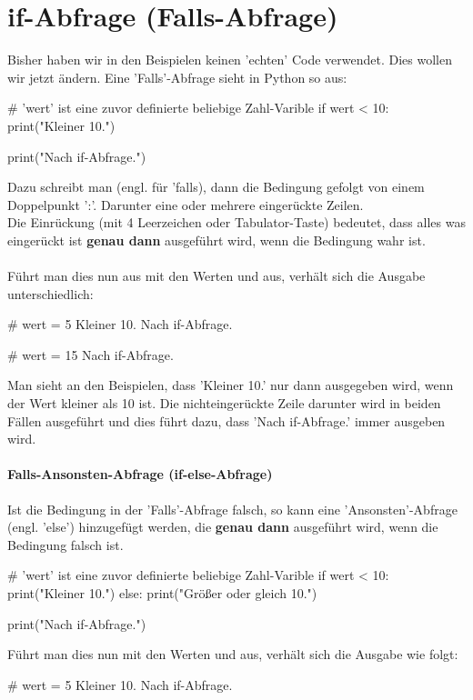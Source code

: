 \documentclass{\VorlagenPfad/coderdojokatext}
\begin{document}
\clearpage

\section{if-Abfrage (Falls-Abfrage)} Bisher haben wir in den Beispielen keinen 'echten' Code verwendet. Dies wollen wir jetzt ändern.
Eine 'Falls'-Abfrage sieht in Python so aus:

\begin{pythoncode}
# 'wert' ist eine zuvor definierte beliebige Zahl-Varible
if wert < 10:
	print("Kleiner 10.")
	
print("Nach if-Abfrage.")
\end{pythoncode}

Dazu schreibt man  (engl. für 'falls), dann die Bedingung gefolgt von einem Doppelpunkt ':'. Darunter eine oder mehrere eingerückte Zeilen.
\\
Die Einrückung (mit 4 Leerzeichen oder Tabulator-Taste) bedeutet, dass alles was eingerückt ist \textbf{genau dann} ausgeführt wird, wenn die Bedingung wahr ist.
\\
\\
Führt man dies nun aus mit den Werten  und  aus, verhält sich die Ausgabe unterschiedlich:
\begin{pythoncode}
# wert = 5
Kleiner 10.
Nach if-Abfrage.
\end{pythoncode}


\begin{pythoncode}
# wert = 15
Nach if-Abfrage.
\end{pythoncode}

Man sieht an den Beispielen, dass 'Kleiner 10.' nur dann ausgegeben wird, wenn der Wert kleiner als 10 ist. Die nichteingerückte Zeile darunter wird in beiden Fällen ausgeführt und dies führt dazu, dass 'Nach if-Abfrage.' immer ausgeben wird.


\paragraph{Falls-Ansonsten-Abfrage (if-else-Abfrage)} Ist die Bedingung in der 'Falls'-Abfrage falsch, so kann eine 'Ansonsten'-Abfrage (engl. 'else') hinzugefügt werden, die \textbf{genau dann} ausgeführt wird, wenn die Bedingung falsch ist.

\begin{pythoncode}
# 'wert' ist eine zuvor definierte beliebige Zahl-Varible
if wert < 10:
	print("Kleiner 10.")
else:
	print("Größer oder gleich 10.")

print("Nach if-Abfrage.")
\end{pythoncode}
Führt man dies nun mit den Werten  und  aus, verhält sich die Ausgabe wie folgt:
\begin{pseudocode}
# wert = 5
Kleiner 10.
Nach if-Abfrage.
\end{pseudocode}
\end{document}
